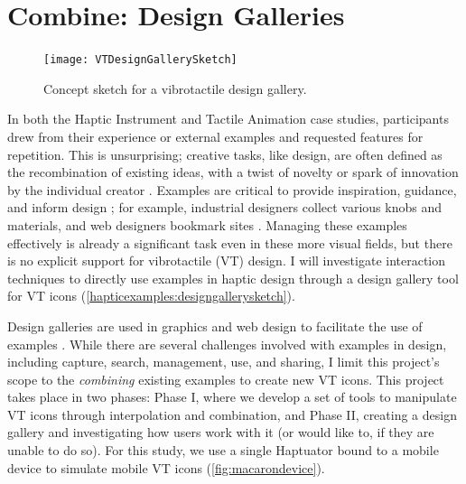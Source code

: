 
\chapter{Combine: Design Galleries}
\label{ch:hapticexamples}

\begin{figure}[htbp]
\begin{center}
\texttt{[image: VTDesignGallerySketch]}

\caption{Concept sketch for a vibrotactile design gallery.}
\label{hapticexamples:designgallerysketch}
\end{center}
\end{figure}

In both the Haptic Instrument and Tactile Animation case studies, participants drew from their experience or external examples and requested features for repetition.
This is unsurprising; creative tasks, like design, are often defined as the recombination of existing ideas, with a twist of novelty or spark of innovation by the individual creator \cite{Warr2005}.
Examples are critical to provide inspiration, guidance, and inform design \cite{Herring2009,Buxton2007}; for example,
industrial designers collect various knobs and materials, and web designers bookmark sites \cite{Herring2009}.
Managing these examples effectively is already a significant task even in these more visual fields, but there is no explicit support for vibrotactile (VT) design.
I will investigate interaction techniques to directly use examples in haptic design through a design gallery tool for VT icons (\autoref{hapticexamples:designgallerysketch}).



Design galleries are used in graphics and web design to facilitate the use of examples \cite{Lee2010a,Marks1997}.
While there are several challenges involved with examples in design, including capture, search, management, use, and sharing, I limit this project's scope to the \emph{combining} existing examples to create new VT icons.
This project takes place in two phases: Phase I, where we develop a set of tools to manipulate VT icons through interpolation and combination, and Phase II, creating a design gallery and investigating how users work with it (or would like to, if they are unable to do so).
For this study, we use a single Haptuator bound to a mobile device to simulate mobile VT icons (\autoref{fig:macarondevice}).



